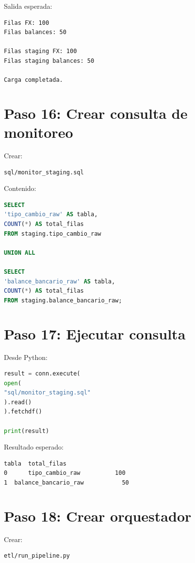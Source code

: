 Salida esperada:

\begin{verbatim}
Filas FX: 100
Filas balances: 50

Filas staging FX: 100
Filas staging balances: 50

Carga completada.
\end{verbatim}

\section{Paso 16: Crear consulta de monitoreo}

Crear:

\begin{verbatim}
sql/monitor_staging.sql
\end{verbatim}

Contenido:

\begin{lstlisting}[language=SQL]
SELECT
'tipo_cambio_raw' AS tabla,
COUNT(*) AS total_filas
FROM staging.tipo_cambio_raw

UNION ALL

SELECT
'balance_bancario_raw' AS tabla,
COUNT(*) AS total_filas
FROM staging.balance_bancario_raw;
\end{lstlisting}

\section{Paso 17: Ejecutar consulta}

Desde Python:

\begin{lstlisting}[language=Python]
result = conn.execute(
open(
"sql/monitor_staging.sql"
).read()
).fetchdf()

print(result)
\end{lstlisting}

Resultado esperado:

\begin{verbatim}
tabla  total_filas
0      tipo_cambio_raw          100
1  balance_bancario_raw           50
\end{verbatim}

\section{Paso 18: Crear orquestador}

Crear:

\begin{verbatim}
etl/run_pipeline.py
\end{verbatim}

